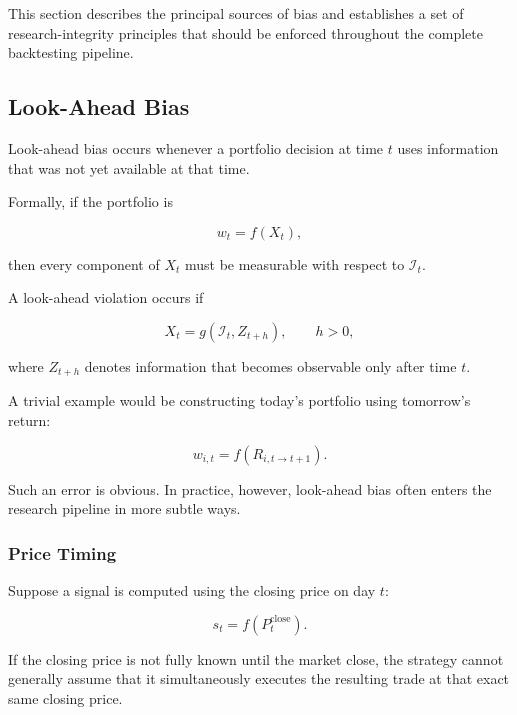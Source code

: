 \documentclass[11pt,a4paper]{article}
\begin{document}
This section describes the principal sources of bias and establishes a set of
research-integrity principles that should be enforced throughout the complete
backtesting pipeline.


\subsection{Look-Ahead Bias}
\label{subsec:look_ahead_bias}

Look-ahead bias occurs whenever a portfolio decision at time $t$ uses
information that was not yet available at that time.

Formally, if the portfolio is

\begin{equation}
w_t
=
f(X_t),
\end{equation}

then every component of $X_t$ must be measurable with respect to
$\mathcal{I}_t$.

A look-ahead violation occurs if

\begin{equation}
X_t
=
g
\left(
\mathcal{I}_t,
Z_{t+h}
\right),
\qquad
h>0,
\end{equation}

where $Z_{t+h}$ denotes information that becomes observable only after time
$t$.

A trivial example would be constructing today's portfolio using tomorrow's
return:

\begin{equation}
w_{i,t}
=
f
\left(
R_{i,t\rightarrow t+1}
\right).
\end{equation}

Such an error is obvious. In practice, however, look-ahead bias often enters
the research pipeline in more subtle ways.


\subsubsection{Price Timing}

Suppose a signal is computed using the closing price on day $t$:

\begin{equation}
s_t
=
f
\left(
P_t^{\mathrm{close}}
\right).
\end{equation}

If the closing price is not fully known until the market close, the strategy
cannot generally assume that it simultaneously executes the resulting trade at
that exact same closing price.
\end{document}
